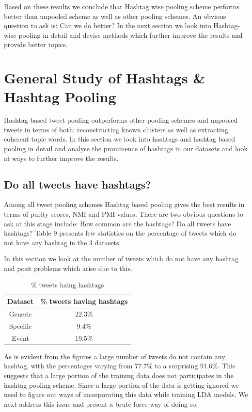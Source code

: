 \documentclass[10pt,a5paper,twoside]{article}
\begin{document}
Based on these results we conclude that Hashtag wise pooling scheme performs better than unpooled scheme as well as other pooling schemes. An obvious question to ask is: Can we do better? In the next section we look into Hashtag-wise pooling in detail and devise methods which further improve the results and provide better topics.

\section{General Study of Hashtags \& Hashtag Pooling}

Hashtag based tweet pooling outperforms other pooling schemes and unpooled tweets in terms of both: reconstructing known clusters as well as extracting coherent topic words. In this section we look into hashtags and hashtag based pooling in detail and analyse the prominence of hashtags in our datasets and look at ways to further improve the results.

\subsection{Do all tweets have hashtags?}
Among all tweet pooling schemes Hashtag based pooling gives the best results in terms of purity scores, NMI and PMI values. There are two obvious questions to ask at this stage include: How common are the hashtags? Do all tweets have hashtags? Table 9 presents few statistics on the percentage of tweets which do not have any hashtag in the 3 datasets.

In this section we look at the number of tweets which do not have any hashtag and posit problems which arise due to this.


\begin{table}[!h]
\setcounter{table}{8}
\centering
	\begin{tabular}{|c|c|}
	\hline
	Dataset & \% tweets having hashtags\\
	\hline
	Generic & 22.3\%\\
	\hline
	Specific & 9.4\% \\
	\hline
	Event & 19.5\% \\
	\hline
	\end{tabular}
\caption{\% tweets haing hashtags}\label{Table}
\end{table}

As is evident from the figures a large number of tweets do not contain any hashtag, with the percentages varying from 77.7\% to a surprising 91.6\%. This suggests that a large portion of the training data does not participates in the hashtag pooling scheme. Since a large portion of the data is getting ignored we need to figure out ways of incorporating this data while training LDA models. We next address this issue and present a brute force way of doing so.
\end{document}
